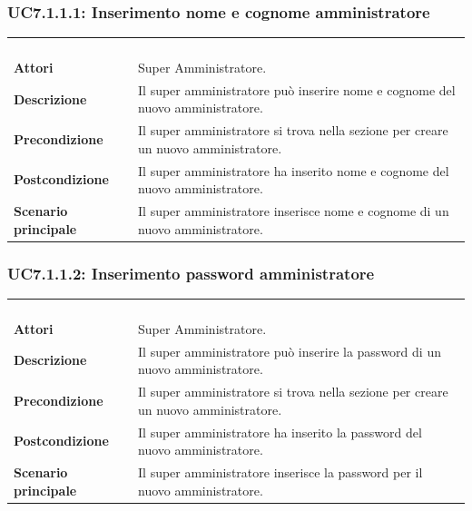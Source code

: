 \subsubsection{UC7.1.1.1: Inserimento nome e cognome amministratore}
\label{UC7.1.1.1}
\begin{longtable}{l|p{10cm}}
\rowcolor[gray]{0.8} \multicolumn{2}{c}{} \\
\rowcolor[gray]{0.8} \multicolumn{2}{c}{\textbf{UC7.1.1.1 - Inserimento nome e cognome amministratore}} \\
\rowcolor[gray]{0.8} \multicolumn{2}{c}{} \\
\hline
&\\
\textbf{Attori} & Super Amministratore.\\[7pt]
\textbf{Descrizione} & Il super amministratore può inserire nome e cognome del nuovo amministratore.\\[7pt]
\textbf{Precondizione} & Il super amministratore si trova nella sezione per creare un nuovo amministratore. \\[7pt]
\textbf{Postcondizione} & Il super amministratore ha inserito nome e cognome del nuovo amministratore.\\[7pt]
\textbf{Scenario principale} &Il super amministratore inserisce nome e cognome di un nuovo amministratore.\\[7pt]\hline
\end{longtable}

\subsubsection{UC7.1.1.2: Inserimento password amministratore}
\label{UC7.1.1.2}
\begin{longtable}{l|p{10cm}}
\rowcolor[gray]{0.8} \multicolumn{2}{c}{} \\
\rowcolor[gray]{0.8} \multicolumn{2}{c}{\textbf{UC7.1.1.2 - Inserimento password amministratore}} \\
\rowcolor[gray]{0.8} \multicolumn{2}{c}{} \\
\hline
&\\
\textbf{Attori} & Super Amministratore.\\[7pt]
\textbf{Descrizione} & Il super amministratore può inserire la password di un nuovo amministratore.\\[7pt]
\textbf{Precondizione} & Il super amministratore si trova nella sezione per creare un nuovo amministratore. \\[7pt]
\textbf{Postcondizione} & Il super amministratore ha inserito la password del nuovo amministratore.\\[7pt]
\textbf{Scenario principale} &Il super amministratore inserisce la password per il nuovo amministratore.\\[7pt]\hline
\end{longtable}

